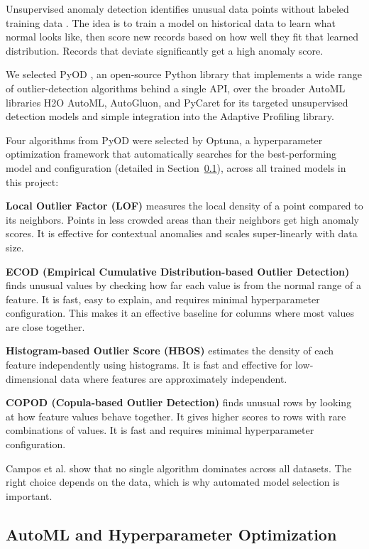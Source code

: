 \documentclass[12pt]{article}
\begin{document}
Unsupervised anomaly detection identifies unusual data points without labeled training data \cite{chandola2009anomaly}. The idea is to train a model on historical data to learn what normal looks like, then score new records based on how well they fit that learned distribution. Records that deviate significantly get a high anomaly score.


We selected PyOD \cite{zhao2019pyod}, an open-source Python library that implements a wide range of outlier-detection algorithms behind a single API, over the broader AutoML libraries H2O AutoML, AutoGluon, and PyCaret for its targeted unsupervised detection models and simple integration into the Adaptive Profiling library.

Four algorithms from PyOD were selected by Optuna, a hyperparameter optimization framework that automatically searches for the best-performing model and configuration (detailed in Section~\ref{sec:automl}), across all trained models in this project:

\textbf{Local Outlier Factor (LOF)} \cite{breunig2000lof} measures the local density of a point compared to its neighbors. Points in less crowded areas than their neighbors get high anomaly scores. It is effective for contextual anomalies and scales super-linearly with data size.

\textbf{ECOD (Empirical Cumulative Distribution-based Outlier Detection)} \cite{li2023ecod} finds unusual values by checking how far each value is from the normal range of a feature. It is fast, easy to explain, and requires minimal hyperparameter configuration. This makes it an effective baseline for columns where most values are close together.

\textbf{Histogram-based Outlier Score (HBOS)} \cite{goldstein2012histogram} estimates the density of each feature independently using histograms. It is fast and effective for low-dimensional data where features are approximately independent.

\textbf{COPOD (Copula-based Outlier Detection)} \cite{li2020copod} finds unusual rows by looking at how feature values behave together. It gives higher scores to rows with rare combinations of values. It is fast and requires minimal hyperparameter configuration.

Campos et al. \cite{campos2016evaluation} show that no single algorithm dominates across all datasets. The right choice depends on the data, which is why automated model selection is important.

\subsection{AutoML and Hyperparameter Optimization}\label{sec:automl}
\end{document}
